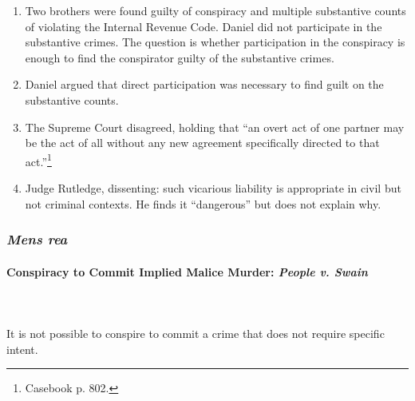 \begin{enumerate}
    \item Two brothers were found guilty of conspiracy and multiple 
    substantive counts of violating the Internal Revenue Code. Daniel did not 
    participate in the substantive crimes. The question is whether 
    participation in the conspiracy is enough to find the conspirator guilty 
    of the substantive crimes.
    \item Daniel argued that direct participation was necessary to find guilt 
    on the substantive counts.
    \item The Supreme Court disagreed, holding that ``an overt act of one 
    partner may be the act of all without any new agreement specifically 
    directed to that act.''\footnote{Casebook p. 802.}
    \item Judge Rutledge, dissenting: such vicarious liability is appropriate 
    in civil but not criminal contexts. He finds it ``dangerous'' but does not 
    explain why.
\end{enumerate}

\subsubsection{\emph{Mens rea}}

\paragraph{Conspiracy to Commit Implied Malice Murder: \emph{People v. Swain}}
~\\\\
It is not possible to conspire to commit a crime that does not require 
specific intent.

